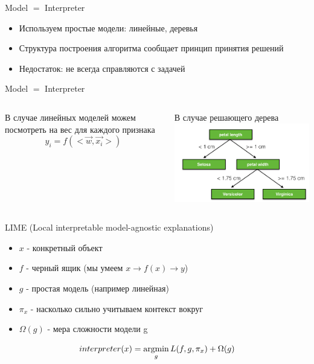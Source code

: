 \documentclass[fleqn, xcolor=x11names]{beamer}
\newcommand{\argmin}{\mathop{\rm argmin}\limits}
\begin{document}
\begin{frame}{Model $=$ Interpreter}
    \begin{itemize}
        \item Используем простые модели: линейные, деревья
        \item Структура построения алгоритма сообщает принцип принятия решений
        \item Недостаток: не всегда справляются с задачей
    \end{itemize}
    
\end{frame}

\begin{frame}{Model $=$ Interpreter}

    \begin{columns}
        \begin{column}{0.5\textwidth}
            В случае линейных моделей можем
            посмотреть на вес для каждого признака
            $$y_i = f(<\vec{w}, \vec{x_i}>)$$
        \end{column}
        \begin{column}{0.5\textwidth}  %
            В случае решающего дерева
            \centering
            \includegraphics[width=6cm]{decision_tree_0.png}
        \end{column}
    \end{columns}

\end{frame}

\begin{frame}{LIME (Local interpretable model-agnostic explanations)}
    \begin{itemize}
        \item $x$ - конкретный объект
        \item $f$ - черный ящик (мы умеем $x\rightarrow f(x) \rightarrow y$)
        \item $g$ - простая модель (например линейная)
        \item $\pi_x$ - насколько сильно учитываем контекст вокруг 
        \item $\Omega(g)$ - мера сложности модели g
    \end{itemize}

    $$interpreter(x) = \argmin_{g}L(f,g,\pi_x) + \Omega (g)$$
    
\end{frame}
\end{document}

